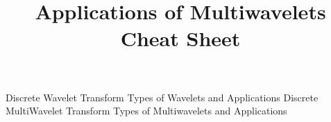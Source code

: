 \documentclass[14pt]{extarticle}
\title{Applications of Multiwavelets Cheat Sheet}
\begin{document}
	\maketitle

	\begin{outline}		
		\1	Discrete Wavelet Transform
		\1	Types of Wavelets and Applications
		\1	Discrete MultiWavelet Transform
		\1	Types of Multiwavelets and Applications
	\end{outline}
\end{document}
